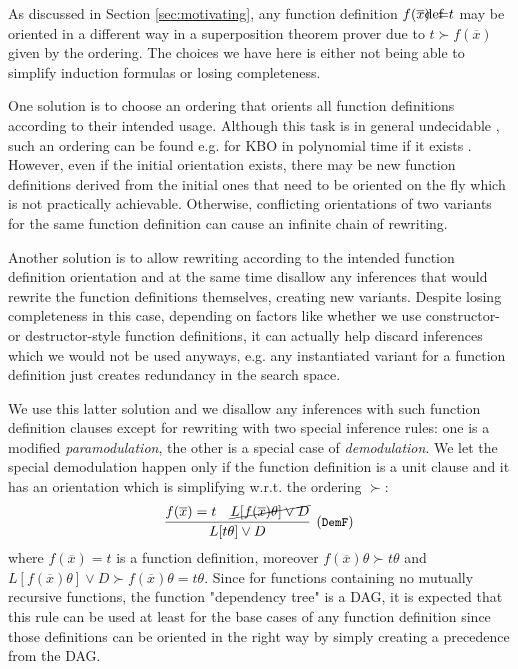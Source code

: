 
As discussed in Section \ref{sec:motivating}, any function definition $f(\overline{x})\fneq t$ may be oriented in a different way in a superposition theorem prover due to $t\succ f(\overline{x})$ given by the ordering. The choices we have here is either not being able to simplify induction formulas or losing completeness.

One solution is to choose an ordering that orients all function definitions according to their intended usage. Although this task is in general undecidable \cite{terminating}, such an ordering can be found e.g. for KBO in polynomial time if it exists \cite{kbodecidability,kbopolynomial}. However, even if the initial orientation exists, there may be new function definitions derived from the initial ones that need to be oriented on the fly which is not practically achievable. Otherwise, conflicting orientations of two variants for the same function definition can cause an infinite chain of rewriting.

Another solution is to allow rewriting according to the intended function definition orientation and at the same time disallow any inferences that would rewrite the function definitions themselves, creating new variants. Despite losing completeness in this case, depending on factors like whether we use constructor- or destructor-style function definitions, it can actually help discard inferences which we would not be used anyways, e.g. any instantiated variant for a function definition just creates redundancy in the search space.

We use this latter solution and we disallow any inferences with such function definition clauses except for rewriting with two special inference rules: one is a modified \textit{paramodulation}, the other is a special case of \textit{demodulation}. We let the special demodulation happen only if the function definition is a unit clause and it has an orientation which is simplifying w.r.t. the ordering $\succ$:
\begin{equation}
	\infer[\small{(\texttt{DemF})}]{L[t\theta]\lor D}
	{f(\overline{x})=t & \cancel{L[f(\overline{x})\theta]\lor D}}
\end{equation}
where $f(\overline{x})=t$ is a function definition, moreover $f(\overline{x})\theta\succ t\theta$ and $L[f(\overline{x})\theta]\lor D\succ f(\overline{x})\theta=t\theta$. Since for functions containing no mutually recursive functions, the function "dependency tree" is a DAG, it is expected that this rule can be used at least for the base cases of any function definition since those definitions can be oriented in the right way by simply creating a precedence from the DAG.

